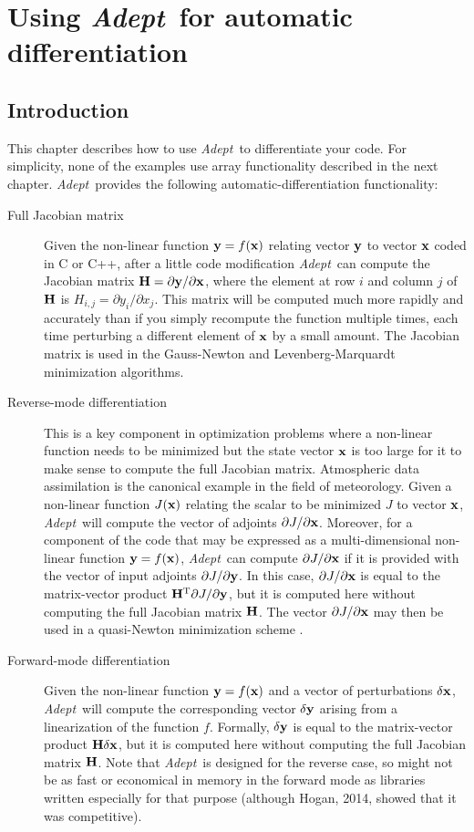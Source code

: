 \documentclass[a4,oneside]{book}
\def\x{\ensuremath{{\bf x}}}
\def\y{\ensuremath{{\bf y}}}
\def\H{\ensuremath{{\bf H}}}
\def\T{\ensuremath{^\mathrm{T}}}
\def\Adept{\emph{Adept}}
\begin{document}
\chapter{Using \Adept\ for automatic differentiation}
\label{chap:ad}
%
\section{Introduction}
\label{sec:ad_functionality}
This chapter describes how to use \Adept\ to differentiate your code.
For simplicity, none of the examples use array functionality described
in the next chapter. \Adept\ provides the following
automatic-differentiation functionality:
%
\begin{description}
\item[Full Jacobian matrix] Given the non-linear function $\y=f(\x)$
  relating vector $\y$ to vector $\x$ coded in C or C++, after a
  little code modification \Adept\ can compute the Jacobian matrix
  $\H=\partial\y/\partial\x$, where the element at row $i$ and column $j$ of
  $\H$ is $H_{i,j}=\partial y_i/\partial x_j$. This matrix will be
  computed much more rapidly and accurately than if you simply
  recompute the function multiple times, each time perturbing a
  different element of $\x$ by a small amount. The Jacobian matrix is
  used in the Gauss-Newton and Levenberg-Marquardt minimization
  algorithms.
\item[Reverse-mode differentiation] This is a key component in
  optimization problems where a non-linear function needs to be
  minimized but the state vector $\x$ is too large for it to make
  sense to compute the full Jacobian matrix. Atmospheric data
  assimilation is the canonical example in the field of
  meteorology. Given a non-linear function $J(\x)$ relating the
  scalar to be minimized $J$ to vector $\x$, \Adept\ will compute the
  vector of adjoints $\partial J/\partial\x$. Moreover, for a
  component of the code that may be expressed as a multi-dimensional
  non-linear function $\y=f(\x)$, \Adept\ can compute $\partial
  J/\partial\x$ if it is provided with the vector of input adjoints
  $\partial J/\partial\y$.  In this case, $\partial J/\partial\x$ is
  equal to the matrix-vector product $\H\T\partial J/\partial\y$, but
  it is computed here without computing the full Jacobian matrix
  $\H$. The vector $\partial J/\partial\x$ may then be used in a
  quasi-Newton minimization scheme \cite[e.g.,][]{Liu+1989}.
\item[Forward-mode differentiation] Given the non-linear function
  $\y=f(\x)$ and a vector of perturbations $\delta\x$, \Adept\ will
  compute the corresponding vector $\delta\y$ arising from a
  linearization of the function $f$. Formally, $\delta\y$ is equal
  to the matrix-vector product $\H\delta\x$, but it is computed here
  without computing the full Jacobian matrix $\H$. Note that
  \Adept\ is designed for the reverse case, so might not be as fast
  or economical in memory in the forward mode as libraries written
  especially for that purpose (although Hogan, 2014, showed that it
  was competitive).
\end{description}%
\end{document}
